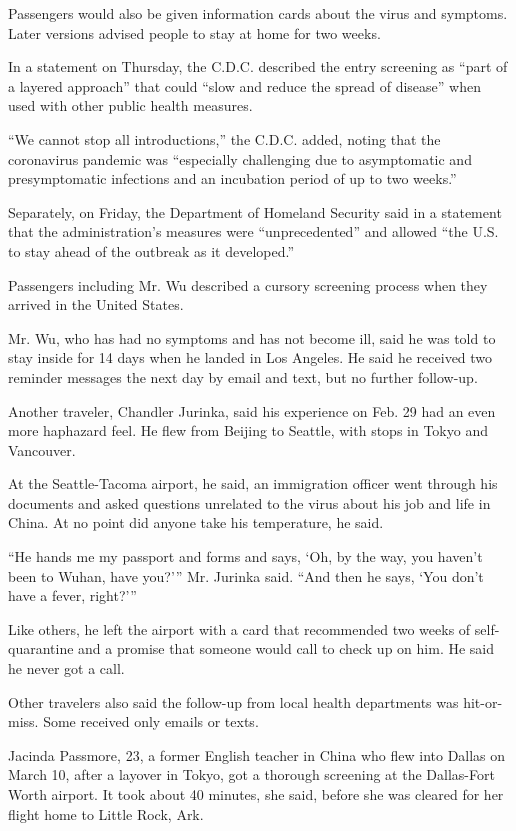 Passengers would also be given information cards about the virus and
symptoms. Later versions advised people to stay at home for two weeks.

In a statement on Thursday, the C.D.C. described the entry screening as
``part of a layered approach'' that could ``slow and reduce the spread
of disease'' when used with other public health measures.

``We cannot stop all introductions,'' the C.D.C. added, noting that the
coronavirus pandemic was ``especially challenging due to asymptomatic
and presymptomatic infections and an incubation period of up to two
weeks.''

Separately, on Friday, the Department of Homeland Security said in a
statement that the administration's measures were ``unprecedented'' and
allowed ``the U.S. to stay ahead of the outbreak as it developed.''

Passengers including Mr. Wu described a cursory screening process when
they arrived in the United States.

Mr. Wu, who has had no symptoms and has not become ill, said he was told
to stay inside for 14 days when he landed in Los Angeles. He said he
received two reminder messages the next day by email and text, but no
further follow-up.

Another traveler, Chandler Jurinka, said his experience on Feb. 29 had
an even more haphazard feel. He flew from Beijing to Seattle, with stops
in Tokyo and Vancouver.

At the Seattle-Tacoma airport, he said, an immigration officer went
through his documents and asked questions unrelated to the virus about
his job and life in China. At no point did anyone take his temperature,
he said.

``He hands me my passport and forms and says, `Oh, by the way, you
haven't been to Wuhan, have you?''' Mr. Jurinka said. ``And then he
says, `You don't have a fever, right?'''

Like others, he left the airport with a card that recommended two weeks
of self-quarantine and a promise that someone would call to check up on
him. He said he never got a call.

Other travelers also said the follow-up from local health departments
was hit-or-miss. Some received only emails or texts.

Jacinda Passmore, 23, a former English teacher in China who flew into
Dallas on March 10, after a layover in Tokyo, got a thorough screening
at the Dallas-Fort Worth airport. It took about 40 minutes, she said,
before she was cleared for her flight home to Little Rock, Ark.

